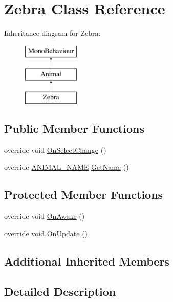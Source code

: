 \hypertarget{class_zebra}{}\section{Zebra Class Reference}
\label{class_zebra}
Inheritance diagram for Zebra\+:\begin{figure}[H]
\begin{center}
\leavevmode
\includegraphics[height=3.000000cm]{class_zebra}
\end{center}
\end{figure}
\subsection*{Public Member Functions}
\begin{DoxyCompactItemize}
\item 
override void \mbox{\hyperlink{class_zebra_a3043e9cd3444f7c439e44f8eefbc55e0}{On\+Select\+Change}} ()
\item 
override \mbox{\hyperlink{_animal_8cs_a2fa5713399b84d1b88dae9196837af50}{A\+N\+I\+M\+A\+L\+\_\+\+N\+A\+ME}} \mbox{\hyperlink{class_zebra_a20dd192a5473bc27ade5c862c9ce7ac4}{Get\+Name}} ()
\end{DoxyCompactItemize}
\subsection*{Protected Member Functions}
\begin{DoxyCompactItemize}
\item 
override void \mbox{\hyperlink{class_zebra_a8111cfb00cc72c135c1840c4760855f2}{On\+Awake}} ()
\item 
override void \mbox{\hyperlink{class_zebra_af47a27c78f160200774e3b6e740e52be}{On\+Update}} ()
\end{DoxyCompactItemize}
\subsection*{Additional Inherited Members}


\subsection{Detailed Description}



